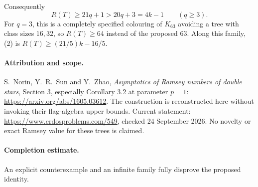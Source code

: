 Consequently
\[
 R(T)\geq21q+1>20q+3=4k-1\qquad(q\geq3). \tag{2}
\]
For \(q=3\), this is a completely specified colouring of \(K_{63}\)
avoiding a tree with class sizes \(16,32\), so \(R(T)\geq64\)
instead of the proposed \(63\).
Along this family, (2) is
\(R(T)\geq(21/5)k-16/5\).

\paragraph{Attribution and scope.}
S.~Norin, Y.~R.~Sun and Y.~Zhao, \emph{Asymptotics of Ramsey numbers
of double stars}, Section 3, especially Corollary 3.2 at parameter
\(p=1\): \url{https://arxiv.org/abs/1605.03612}.
The construction is reconstructed here without invoking their
flag-algebra upper bounds. Current statement:
\url{https://www.erdosproblems.com/549}, checked 24 September 2026.
No novelty or exact Ramsey value for these trees is claimed.

\paragraph{Completion estimate.}
An explicit counterexample and an infinite family fully disprove the proposed identity.
